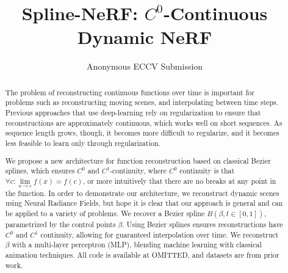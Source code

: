 \documentclass[runningheads]{llncs}
\begin{document}
\pagestyle{headings}
\mainmatter
\def\ECCVSubNumber{6195}

\title{Spline-NeRF: $C^0$-Continuous Dynamic NeRF}
\author{Anonymous ECCV Submission}
\institute{Paper ID \ECCVSubNumber}

\maketitle

\begin{abstract}
The problem of reconstructing continuous functions over time is important for problems such as reconstructing moving scenes, and interpolating between time steps.
Previous approaches that use deep-learning rely on regularization to ensure that reconstructions are approximately continuous, which works well on short sequences. As sequence length grows, though, it becomes more difficult to regularize, and it becomes less feasible to learn only through regularization.

We propose a new architecture for function reconstruction based on classical Bezier splines, which ensures $C^0$ and $C^1$-continuity, where $C^0$ continuity is that $\forall c:\lim\limits_{x\to c} f(x) = f(c)$, or more intuitively that there are no breaks at any point in the function. In order to demonstrate our architecture, we reconstruct dynamic scenes using Neural Radiance Fields, but hope it is clear that our approach is general and can be applied to a variety of problems. We recover a Bezier spline $B(\beta, t\in[0,1])$,
parametrized by the control points $\beta$. Using Bezier splines ensures reconstructions have $C^0$ and $C^1$ continuity, allowing for guaranteed interpolation over time. We reconstruct $\beta$ with a multi-layer perceptron (MLP), blending machine learning with classical animation techniques. All code is available at
OMITTED, and datasets are from prior work.

\end{abstract}
\end{document}
